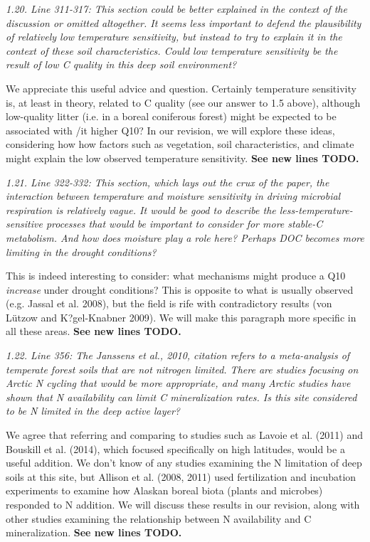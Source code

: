 \documentclass[11pt, oneside]{article}
\begin{document}
\medskip
{\it 1.20. Line 311-317: This section could be better explained in the context of the discussion or omitted altogether. It seems less important to defend the plausibility of relatively low temperature sensitivity, but instead to try to explain it in the context of these soil characteristics. Could low temperature sensitivity be the result of low C quality in this deep soil environment? }

We appreciate this useful advice and question. Certainly temperature sensitivity is, at least in theory, related to C quality (see our answer to 1.5 above), although low-quality litter (i.e. in a boreal coniferous forest) might be expected to be associated with {/it higher} Q10? In our revision, we will explore these ideas, considering how how factors such as vegetation, soil characteristics, and climate might explain the low observed temperature sensitivity. {\bf See new lines TODO.}

\medskip
{\it 1.21. Line 322-332: This section, which lays out the crux of the paper, the interaction between temperature and moisture sensitivity in driving microbial respiration is relatively vague. It would be good to describe the less-temperature-sensitive processes that would be important to consider for more stable-C metabolism. And how does moisture play a role here? Perhaps DOC becomes more limiting in the drought conditions? }

This is indeed interesting to consider: what mechanisms might produce a Q10 {\it increase} under drought conditions? This is opposite to what is usually observed (e.g. Jassal et al. 2008), but the field is rife with contradictory results (von Lützow and K?gel-Knabner 2009). We will make this paragraph more specific in all these areas. {\bf See new lines TODO.}

\medskip
{\it 1.22. Line 356: The Janssens et al., 2010, citation refers to a meta-analysis of temperate forest soils that are not nitrogen limited. There are studies focusing on Arctic N cycling that would be more appropriate, and many Arctic studies have shown that N availability can limit C mineralization rates. Is this site considered to be N limited in the deep active layer? }

We agree that referring and comparing to studies such as Lavoie et al. (2011) and Bouskill et al. (2014), which focused specifically on high latitudes, would be a useful addition. We don't know of any studies examining the N limitation of deep soils at this site, but Allison et al. (2008, 2011) used fertilization and incubation experiments to examine how Alaskan boreal biota (plants and microbes) responded to N addition. We will discuss these results in our revision, along with other studies examining the relationship between N availability and C mineralization. {\bf See new lines TODO.}
\end{document}
